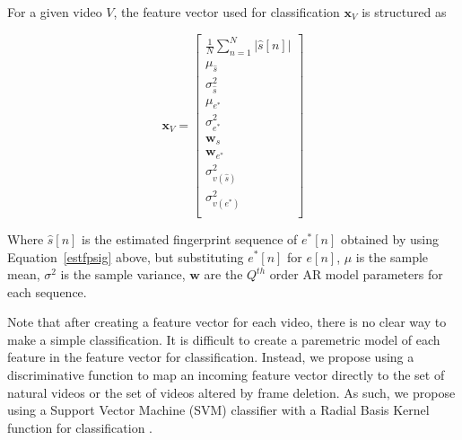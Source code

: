 For a given video $V$, the feature vector used for classification $\bm{x}_{V}$ is structured as

\begin{equation}
  \bm{x}_{V} = \begin{bmatrix}
    \frac{1}{N} \sum_{n=1}^{N} \vert \hat{s}[n] \vert \\
    \mu_{\hat{s}} \\
    \sigma_{\hat{s}}^{2} \\
    \mu_{e^{*}} \\
    \sigma_{e^{*}}^{2} \\
    \bm{w}_{\hat{s}} \\
    \bm{w}_{e^{*}} \\
    \sigma_{v(\hat{s})}^{2} \\
    \sigma_{v(e^{*})}^{2} \\
  \end{bmatrix}
\end{equation}

Where $\hat{s}[n]$ is the estimated fingerprint sequence of $e^{*}[n]$ obtained by using Equation~\ref{estfpsig} above, but substituting $e^{*}[n]$ for $e[n]$, $\mu$ is the sample mean, $\sigma^{2}$ is the sample variance, $\bm{w}$ are the $Q^{th}$ order AR model parameters for each sequence.

Note that after creating a feature vector for each video, there is no clear way to make a simple classification. It is difficult to create a paremetric model of each feature in the feature vector for classification. Instead, we propose using a discriminative function to map an incoming feature vector directly to the set of natural videos or the set of videos altered by frame deletion. As such, we propose using a Support Vector Machine (SVM) classifier with a Radial Basis Kernel function for classification \cite{svm}. 